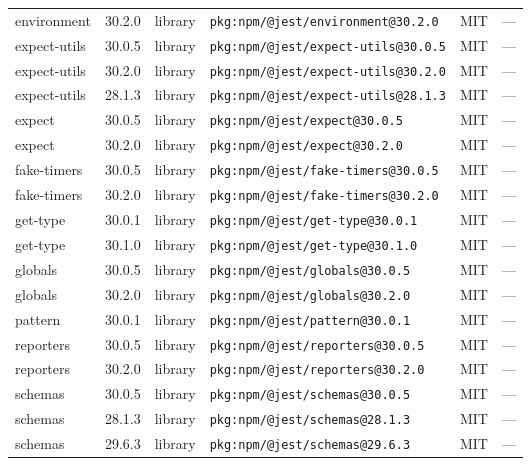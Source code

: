 \documentclass[11pt,a4paper]{article}
\begin{document}
\begin{longtable}{|p{4cm}|p{2cm}|p{1.6cm}|p{5cm}|p{1.5cm}|p{3.5cm}|}
\raggedright environment & 30.2.0 & library & \small\texttt{pkg:npm/@jest/environment@30.2.0} & MIT & \small — \\
\raggedright expect-utils & 30.0.5 & library & \small\texttt{pkg:npm/@jest/expect-utils@30.0.5} & MIT & \small — \\
\raggedright expect-utils & 30.2.0 & library & \small\texttt{pkg:npm/@jest/expect-utils@30.2.0} & MIT & \small — \\
\raggedright expect-utils & 28.1.3 & library & \small\texttt{pkg:npm/@jest/expect-utils@28.1.3} & MIT & \small — \\
\raggedright expect & 30.0.5 & library & \small\texttt{pkg:npm/@jest/expect@30.0.5} & MIT & \small — \\
\raggedright expect & 30.2.0 & library & \small\texttt{pkg:npm/@jest/expect@30.2.0} & MIT & \small — \\
\raggedright fake-timers & 30.0.5 & library & \small\texttt{pkg:npm/@jest/fake-timers@30.0.5} & MIT & \small — \\
\raggedright fake-timers & 30.2.0 & library & \small\texttt{pkg:npm/@jest/fake-timers@30.2.0} & MIT & \small — \\
\raggedright get-type & 30.0.1 & library & \small\texttt{pkg:npm/@jest/get-type@30.0.1} & MIT & \small — \\
\raggedright get-type & 30.1.0 & library & \small\texttt{pkg:npm/@jest/get-type@30.1.0} & MIT & \small — \\
\raggedright globals & 30.0.5 & library & \small\texttt{pkg:npm/@jest/globals@30.0.5} & MIT & \small — \\
\raggedright globals & 30.2.0 & library & \small\texttt{pkg:npm/@jest/globals@30.2.0} & MIT & \small — \\
\raggedright pattern & 30.0.1 & library & \small\texttt{pkg:npm/@jest/pattern@30.0.1} & MIT & \small — \\
\raggedright reporters & 30.0.5 & library & \small\texttt{pkg:npm/@jest/reporters@30.0.5} & MIT & \small — \\
\raggedright reporters & 30.2.0 & library & \small\texttt{pkg:npm/@jest/reporters@30.2.0} & MIT & \small — \\
\raggedright schemas & 30.0.5 & library & \small\texttt{pkg:npm/@jest/schemas@30.0.5} & MIT & \small — \\
\raggedright schemas & 28.1.3 & library & \small\texttt{pkg:npm/@jest/schemas@28.1.3} & MIT & \small — \\
\raggedright schemas & 29.6.3 & library & \small\texttt{pkg:npm/@jest/schemas@29.6.3} & MIT & \small — \\

\end{longtable}
\end{document}
